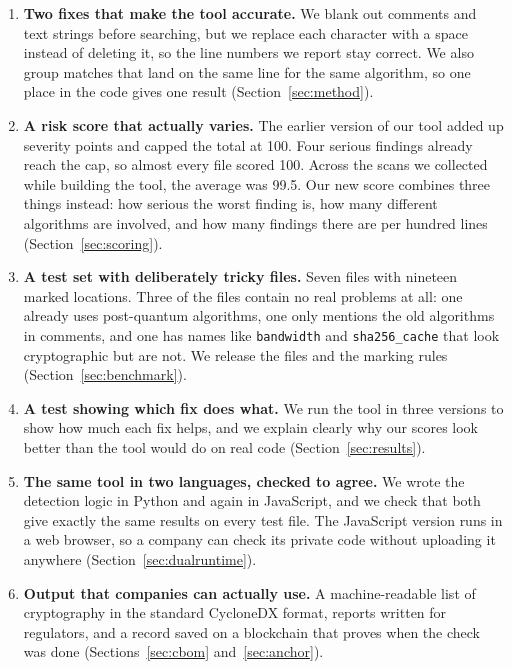 \documentclass[runningheads]{llncs}
\begin{document}
\begin{enumerate}
  \item \textbf{Two fixes that make the tool accurate.} We blank out comments
  and text strings before searching, but we replace each character with a space
  instead of deleting it, so the line numbers we report stay correct. We also
  group matches that land on the same line for the same algorithm, so one place
  in the code gives one result (Section~\ref{sec:method}).

  \item \textbf{A risk score that actually varies.} The earlier version of our
  tool added up severity points and capped the total at 100. Four serious
  findings already reach the cap, so almost every file scored 100. Across the
  scans we collected while building the tool, the average was 99.5. Our new
  score combines three things instead: how serious the worst finding is, how
  many different algorithms are involved, and how many findings there are per
  hundred lines (Section~\ref{sec:scoring}).

  \item \textbf{A test set with deliberately tricky files.} Seven files with
  nineteen marked locations. Three of the files contain no real problems at all:
  one already uses post-quantum algorithms, one only mentions the old algorithms
  in comments, and one has names like \texttt{bandwidth} and
  \texttt{sha256\_cache} that look cryptographic but are not. We release the
  files and the marking rules (Section~\ref{sec:benchmark}).

  \item \textbf{A test showing which fix does what.} We run the tool in three
  versions to show how much each fix helps, and we explain clearly why our
  scores look better than the tool would do on real code
  (Section~\ref{sec:results}).

  \item \textbf{The same tool in two languages, checked to agree.} We wrote the
  detection logic in Python and again in JavaScript, and we check that both give
  exactly the same results on every test file. The JavaScript version runs in a
  web browser, so a company can check its private code without uploading it
  anywhere (Section~\ref{sec:dualruntime}).

  \item \textbf{Output that companies can actually use.} A machine-readable
  list of cryptography in the standard CycloneDX format, reports written for
  regulators, and a record saved on a blockchain that proves when the check was
  done (Sections~\ref{sec:cbom} and~\ref{sec:anchor}).
\end{enumerate}
\end{document}
